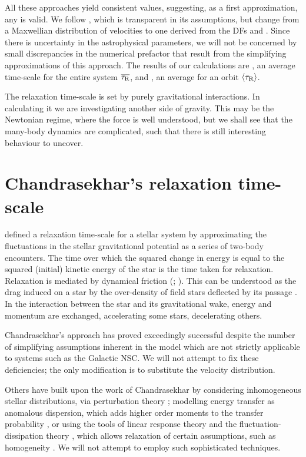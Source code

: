 All these approaches yield consistent values, suggesting, as a first approximation, any is valid. We follow \citet[chapter 2]{Chandrasekhar1960}, which is transparent in its assumptions, but change from a Maxwellian distribution of velocities to one derived from the DFs  and . Since there is uncertainty in the astrophysical parameters, we will not be concerned by small discrepancies in the numerical prefactor that result from the simplifying approximations of this approach. The results of our calculations are , an average time-scale for the entire system $\overline{\tau_\mathrm{R}}$, and , an average for an orbit $\left\langle\tau_\mathrm{R}\right\rangle$.

The relaxation time-scale is set by purely gravitational interactions. In calculating it we are investigating another side of gravity. This may be the Newtonian regime, where the force is well understood, but we shall see that the many-body dynamics are complicated, such that there is still interesting behaviour to uncover.

\section{Chandrasekhar's relaxation time-scale}\label{sec:time-scale}

\citet[chapter 2]{Chandrasekhar1960} defined a relaxation time-scale for a stellar system by approximating the fluctuations in the stellar gravitational potential as a series of two-body encounters. The time over which the squared change in energy is equal to the squared (initial) kinetic energy of the star is the time taken for relaxation. Relaxation is mediated by dynamical friction (\citealt{Chandrasekhar1943a}; \citealt[section 1.2]{Binney2008}). This can be understood as the drag induced on a star by the over-density of field stars deflected by its passage \citep{Mulder1983}. In the interaction between the star and its gravitational wake, energy and momentum are exchanged, accelerating some stars, decelerating others.

Chandrasekhar's approach has proved exceedingly successful despite the number of simplifying assumptions inherent in the model which are not strictly applicable to systems such as the Galactic NSC. We will not attempt to fix these deficiencies; the only modification is to substitute the velocity distribution.

Others have built upon the work of Chandrasekhar by considering inhomogeneous stellar distributions, via perturbation theory \citep{Lynden-Bell1972,Tremaine1984,Weinberg1986}; modelling energy transfer as anomalous dispersion, which adds higher order moments to the transfer probability \citep{Bar-Or2012}, or using the tools of linear response theory and the fluctuation-dissipation theory \citep[chapter 7]{Landau1958}, which allows relaxation of certain assumptions, such as homogeneity \citep{Bekenstein1992,Maoz1993,Nelson1999}. We will not attempt to employ such sophisticated techniques.

